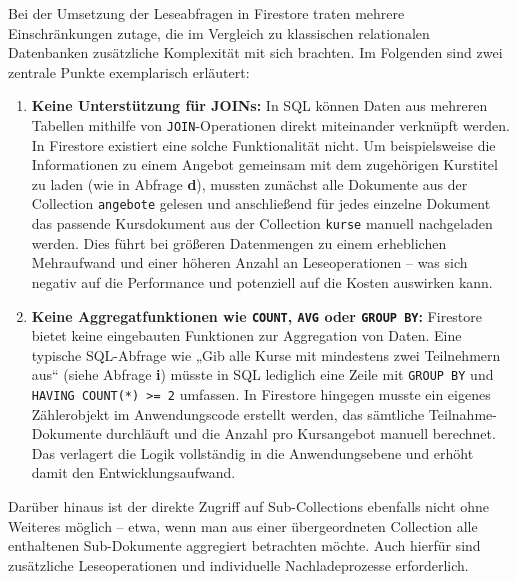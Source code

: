 \documentclass[12pt,a4paper%
              ,oneside     %
              ,titlepage
              ,DIV=13
              ,headinclude
              ,footinclude=false%
              ,cleardoublepage=empty%
              ,parskip=half,
              BCOR=0mm,
              ]{scrreprt}
\begin{document}
Bei der Umsetzung der Leseabfragen in Firestore traten mehrere Einschränkungen zutage, die im Vergleich zu klassischen relationalen Datenbanken zusätzliche Komplexität mit sich brachten. Im Folgenden sind zwei zentrale Punkte exemplarisch erläutert:

\begin{enumerate}
	\item \textbf{Keine Unterstützung für JOINs:} 
	In SQL können Daten aus mehreren Tabellen mithilfe von \texttt{JOIN}-Operationen direkt miteinander verknüpft werden. In Firestore existiert eine solche Funktionalität nicht. Um beispielsweise die Informationen zu einem Angebot gemeinsam mit dem zugehörigen Kurstitel zu laden (wie in Abfrage \textbf{d}), mussten zunächst alle Dokumente aus der Collection \texttt{angebote} gelesen und anschließend für jedes einzelne Dokument das passende Kursdokument aus der Collection \texttt{kurse} manuell nachgeladen werden. Dies führt bei größeren Datenmengen zu einem erheblichen Mehraufwand und einer höheren Anzahl an Leseoperationen – was sich negativ auf die Performance und potenziell auf die Kosten auswirken kann.
	
	\item \textbf{Keine Aggregatfunktionen wie \texttt{COUNT}, \texttt{AVG} oder \texttt{GROUP BY}:} 
	Firestore bietet keine eingebauten Funktionen zur Aggregation von Daten. Eine typische SQL-Abfrage wie „Gib alle Kurse mit mindestens zwei Teilnehmern aus“ (siehe Abfrage \textbf{i}) müsste in SQL lediglich eine Zeile mit \texttt{GROUP BY} und \texttt{HAVING COUNT(*) >= 2} umfassen. In Firestore hingegen musste ein eigenes Zählerobjekt im Anwendungscode erstellt werden, das sämtliche Teilnahme-Dokumente durchläuft und die Anzahl pro Kursangebot manuell berechnet. Das verlagert die Logik vollständig in die Anwendungsebene und erhöht damit den Entwicklungsaufwand.
\end{enumerate}

Darüber hinaus ist der direkte Zugriff auf Sub-Collections ebenfalls nicht ohne Weiteres möglich – etwa, wenn man aus einer übergeordneten Collection alle enthaltenen Sub-Dokumente aggregiert betrachten möchte. Auch hierfür sind zusätzliche Leseoperationen und individuelle Nachladeprozesse erforderlich.
\end{document}
